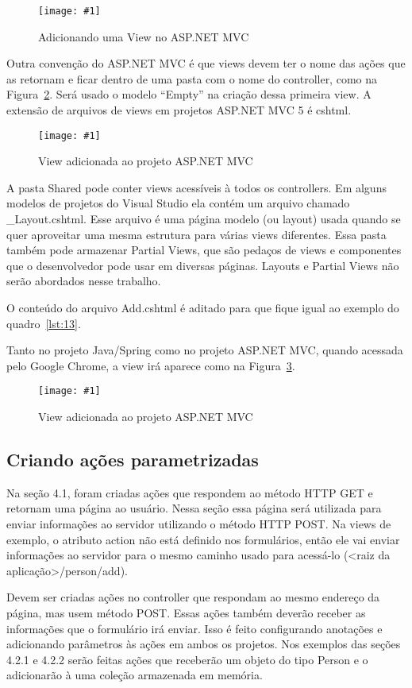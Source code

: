 \documentclass[a4paper,12pt]{article}
\newcommand{\figura}[3] {
	\begin{figure}[ht]
		\centering
		\texttt{[image: \#1]}
		\caption{#2}
		\label{#3}
	\end{figure}
	\FloatBarrier
}
\newcommand{\razorcode}[3] {
	
}
\begin{document}
\figura{26.png}{Adicionando uma View no ASP.NET MVC}{fig:26}

Outra convenção do ASP.NET MVC é que views devem ter o nome das ações que as retornam e ficar dentro de uma pasta com o nome do controller, como na Figura~\ref{fig:27}. Será usado o modelo “Empty” na criação dessa primeira view. A extensão de arquivos de views em projetos ASP.NET MVC 5 é cshtml.

\figura{27.png}{View adicionada ao projeto ASP.NET MVC}{fig:27}

A pasta Shared pode conter views acessíveis à todos os controllers. Em alguns modelos de projetos do Visual Studio ela contém um arquivo chamado \_Layout.cshtml. Esse arquivo é uma página modelo (ou layout) usada quando se quer aproveitar uma mesma estrutura para várias views diferentes. Essa pasta também pode armazenar Partial Views, que são pedaços de views e componentes que o desenvolvedor pode usar em diversas páginas. Layouts e Partial Views não serão abordados nesse trabalho.

O conteúdo do arquivo Add.cshtml é aditado para que fique igual ao exemplo do quadro~\ref{lst:13}.

\razorcode{code/13.txt}{O arquivo Add.cshtml}{lst:13}

Tanto no projeto Java/Spring como no projeto ASP.NET MVC, quando acessada pelo Google Chrome, a view irá aparece como na Figura~\ref{fig:28}. 

\figura{28.png}{View adicionada ao projeto ASP.NET MVC}{fig:28}

\subsection{Criando ações parametrizadas}

Na seção 4.1, foram criadas ações que respondem ao método HTTP GET e retornam uma página ao usuário. Nessa seção essa página será utilizada para enviar informações ao servidor utilizando o método HTTP POST. Na views de exemplo, o atributo action não está definido nos formulários, então ele vai enviar informações ao servidor para o mesmo caminho usado para acessá-lo (<raiz da aplicação>/person/add).

Devem ser criadas ações no controller que respondam ao mesmo endereço da página, mas usem método POST. Essas ações também deverão receber as informações que o formulário irá enviar. Isso é feito configurando anotações e adicionando parâmetros às ações em ambos os projetos. Nos exemplos das seções 4.2.1 e 4.2.2 serão feitas ações que receberão um objeto do tipo Person e o adicionarão à uma coleção armazenada em memória.
\end{document}
